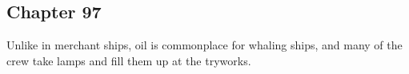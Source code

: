 \subsection{Chapter 97}

Unlike in merchant ships, oil is commonplace for whaling ships, and many of the
crew take lamps and fill them up at the tryworks.
